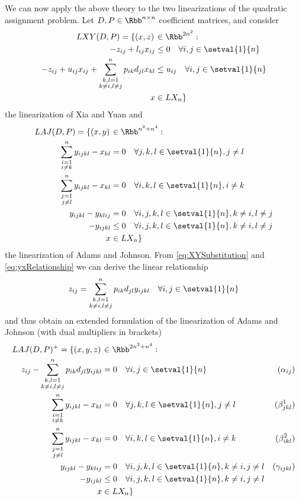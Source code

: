 We can now apply the above theory to the two linearizations of the quadratic assignment problem. Let $D, P\in\Rbb^{n\times n}$ coefficient matrices, and consider
\begin{align*}
	LXY(D,P) = \left\{(x,z)\right.&\in \Rbb^{2n^2}:\\
	-z_{ij}+l_{ij}x_{ij}&\leq 0\quad\forall i,j \in\setval{1}{n}\\
	-z_{ij}+u_{ij}x_{ij}+\sum_{\substack{k,l=1\\k\neq i, l\neq j}}^np_{ik}d_{jl}x_{kl}&\leq u_{ij}\quad\forall i,j\in\setval{1}{n}\\
	x&\left.\in LX_n\right\}
\end{align*}
the linearization of Xia and Yuan and
\begin{align*}
	LAJ(D,P) = \left\{(x,y)\right.&\in\Rbb^{n^2+n^4}:\\
	\sum_{\substack{i=1\\i\neq k}}^ny_{ijkl}-x_{kl}&=0\quad\forall j,k,l\in\setval{1}{n}, j\neq l\\
	\sum_{\substack{j=1\\j\neq l}}^ny_{ijkl}-x_{kl}&=0\quad\forall i,k,l\in\setval{1}{n}, i\neq k\\
	y_{ijkl}-y_{klij}&=0\quad\forall i,j,k,l\in\setval{1}{n}, k\neq i, l\neq j\\
	-y_{ijkl}&\leq 0\quad\forall i,j,k,l\in\setval{1}{n}, k\neq i, l\neq j\\
	x&\left.\in LX_n\right\}
\end{align*}
the linearization of Adams and Johnson. From \eqref{eq:XYSubstitution} and \eqref{eq:yxRelationship} we can derive the linear relationship
\begin{equation}
\label{eq:zyzusammenhang}
	z_{ij} = \sum_{\substack{k,l=1\\k\neq i, l\neq j}}^np_{ik}d_{jl}y_{ijkl}\quad\forall i,j\in\setval{1}{n}
\end{equation}
and thus obtain an extended formulation of the linearization of Adams and Johnson (with dual multipliers in brackets)
\begin{align*}
\allowdisplaybreaks
	LAJ(D,P)^+ = \left\{(x,y,z)\right.&\in\Rbb^{2n^2+n^4}:\\
	z_{ij} - \sum_{\substack{k,l=1\\k\neq i, l\neq j}}^np_{ik}d_{jl}y_{ijkl}&=0\quad\forall i,j\in\setval{1}{n}&(\alpha_{ij})\\
	\sum_{\substack{i=1\\i\neq k}}^ny_{ijkl}-x_{kl}&=0\quad\forall j,k,l\in\setval{1}{n}, j\neq l&(\beta^1_{jkl})\\
	\sum_{\substack{j=1\\j\neq l}}^ny_{ijkl}-x_{kl}&=0\quad\forall i,k,l\in\setval{1}{n}, i\neq k&(\beta^2_{ikl})\\
	y_{ijkl}-y_{klij}&=0\quad\forall i,j,k,l\in\setval{1}{n}, k\neq i, j\neq l&(\gamma_{ijkl})\\
	-y_{ijkl}&\leq 0\quad\forall i,j,k,l\in\setval{1}{n}, k\neq i, j\neq l\\
	x&\left.\in LX_n\right\}
\end{align*}

